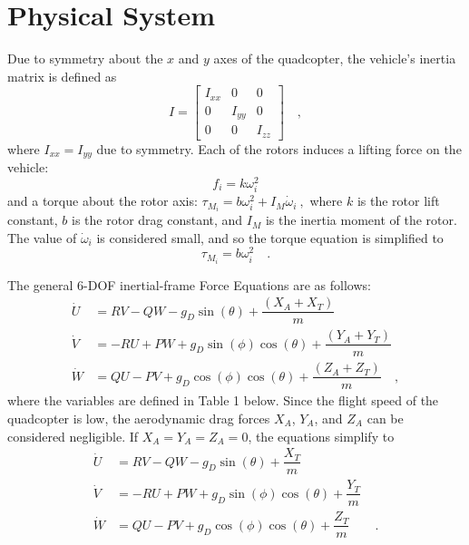 \section*{Physical System}

Due to symmetry about the $x$ and $y$ axes of the quadcopter, the vehicle's inertia matrix is defined as
\begin{equation}
    I = 
    \begin{bmatrix}
        I_{xx} & 0 & 0 \\
        0 & I_{yy} & 0 \\
        0 & 0 & I_{zz}
    \end{bmatrix} \quad ,
\end{equation} where $I_{xx} = I_{yy}$ due to symmetry. Each of the rotors induces a lifting force on the vehicle:
\begin{equation}
    f_{i} = k \omega_i^2
\end{equation}
and a torque about the rotor axis: $\tau_{M_{i}} = b \omega_i^2 + I_M \dot{\omega}_i ~,$ where $k$ is the rotor lift constant, $b$ is the rotor drag constant, and $I_M$ is the inertia moment of the rotor. The value of $\dot{\omega}_i$ is considered small, and so the torque equation is simplified to 
\begin{equation}
    \tau_{M_{i}} = b \omega_i^2 \quad .
\end{equation}

The general 6-DOF inertial-frame Force Equations are as follows:
\begin{align*}
    \dot{U} &= RV - QW - g_D\sin(\theta) + \dfrac{(X_A + X_T)}{m} \\
    \dot{V} &= -RU + PW + g_D\sin(\phi)\cos(\theta) + \dfrac{(Y_A + Y_T)}{m} \\
    \dot{W} &= QU - PV + g_D\cos(\phi)\cos(\theta) + \dfrac{(Z_A + Z_T)}{m} \quad ,
\end{align*}
where the variables are defined in Table 1 below. Since the flight speed of the quadcopter is low, the aerodynamic drag forces $X_A$, $Y_A$, and $Z_A$ can be considered negligible. If $X_A = Y_A = Z_A = 0$, the equations simplify to
\begin{align}
    \dot{U} &= RV - QW - g_D\sin(\theta) + \dfrac{X_T}{m} \\
    \dot{V} &= -RU + PW + g_D\sin(\phi)\cos(\theta) + \dfrac{Y_T}{m} \\
    \dot{W} &= QU - PV + g_D\cos(\phi)\cos(\theta) + \dfrac{Z_T}{m} \quad\quad .
\end{align}

